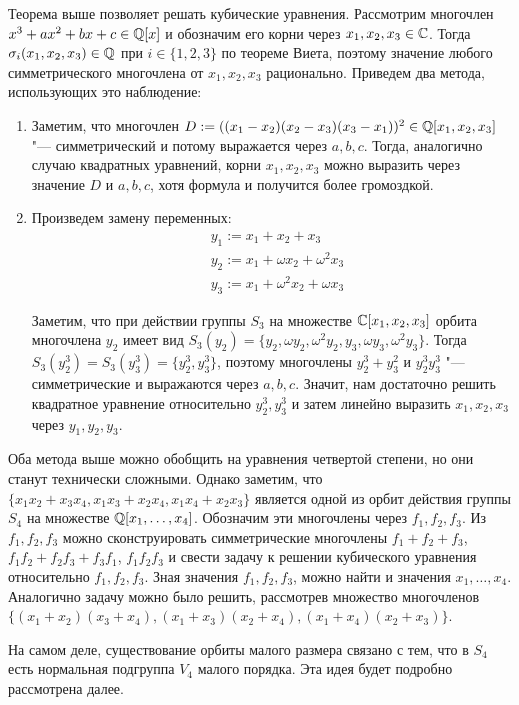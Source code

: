 \begin{example}
	Теорема выше позволяет решать кубические уравнения. Рассмотрим многочлен $x^3 + ax^2 + bx + c \in \mathbb{Q}[x]$ и обозначим его корни через $x_1, x_2, x_3 \in \mathbb{C}$. Тогда $\sigma_i(x_1, x_2, x_3) \in \mathbb{Q}$ при $i \in \{1, 2, 3\}$ по теореме Виета, поэтому значение любого симметрического многочлена от $x_1, x_2, x_3$ рационально. Приведем два метода, использующих это наблюдение:
	\begin{enumerate}
		\item Заметим, что многочлен $D := ((x_1 - x_2)(x_2 - x_3)(x_3 - x_1))^2 \in \mathbb{Q}[x_1, x_2, x_3]$ "--- симметрический и потому выражается через $a, b, c$. Тогда, аналогично случаю квадратных уравнений, корни $x_1, x_2, x_3$ можно выразить через значение $D$ и $a, b, c$, хотя формула и получится более громоздкой.
		\item Произведем замену переменных:
		\begin{align*}
			&y_1 := x_1 + x_2 + x_3\\
			&y_2 := x_1 + \omega x_2 + \omega^2 x_3\\
			&y_3 := x_1 + \omega^2 x_2 + \omega x_3
		\end{align*}
	
		Заметим, что при действии группы $S_3$ на множестве $\mathbb{C}[x_1, x_2, x_3]$ орбита многочлена $y_2$ имеет вид $S_3(y_2) = \{y_2, \omega y_2, \omega^2 y_2, y_3, \omega y_3, \omega^2 y_3\}$. Тогда $S_3(y_2^3) = S_3(y_3^3) = \{y_2^3, y_3^3\}$, поэтому многочлены $y_2^3 + y_3^2$ и $y_2^3y_3^3$ "--- симметрические и выражаются через $a, b, c$. Значит, нам достаточно решить квадратное уравнение относительно $y_2^3, y_3^3$ и затем линейно выразить $x_1, x_2, x_3$ через $y_1, y_2, y_3$.
	\end{enumerate}
\end{example}

\begin{note}
	Оба метода выше можно обобщить на уравнения четвертой степени, но они станут технически сложными. Однако заметим, что $\{x_1x_2 + x_3x_4, x_1x_3 + x_2x_4, x_1x_4 + x_2x_3\}$ является одной из орбит действия группы $S_4$ на множестве $\mathbb{Q}[x_1, \dotsc, x_4]$. Обозначим эти многочлены через $f_1, f_2, f_3$. Из $f_1, f_2, f_3$ можно сконструировать симметрические многочлены $f_1 + f_2 + f_3$, $f_1f_2 + f_2f_3 + f_3f_1$, $f_1f_2f_3$ и свести задачу к решении кубического уравнения относительно $f_1, f_2, f_3$. Зная значения $f_1, f_2, f_3$, можно найти и значения $x_1, \dotsc, x_4$. Аналогично задачу можно было решить, рассмотрев множество многочленов $\{(x_1 + x_2)(x_3 + x_4), (x_1 + x_3)(x_2 + x_4), (x_1 + x_4)(x_2 + x_3)\}$.
	
	На самом деле, существование орбиты малого размера связано с тем, что в $S_4$ есть нормальная подгруппа $V_4$ малого порядка. Эта идея будет подробно рассмотрена далее.
\end{note}